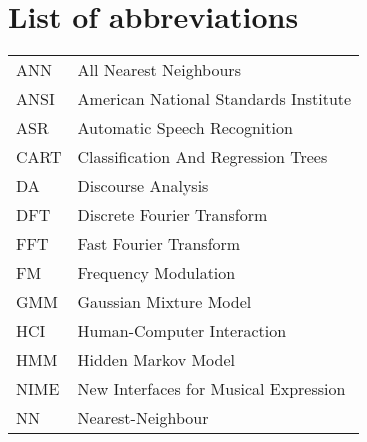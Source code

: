 
\chapter*{List of abbreviations}

\begin{table}[htbp]
\begin{center}
\begin{tabular}{ll}

ANN  	&	All Nearest Neighbours		\\
ANSI 	&	American National Standards Institute		\\
ASR  	&	Automatic Speech Recognition		\\
CART    &	Classification And Regression Trees		\\
DA    	&	Discourse Analysis		\\
DFT  	&	Discrete Fourier Transform		\\
FFT   	&	Fast Fourier Transform		\\
FM    	&	Frequency Modulation		\\
GMM 	&	Gaussian Mixture Model		\\
HCI   	&	Human-Computer Interaction		\\
HMM    	&	Hidden Markov Model		\\
NIME  	&	New Interfaces for Musical Expression		\\
NN    	&	Nearest-Neighbour		\\

\end{tabular}
\end{center}
\end{table}%